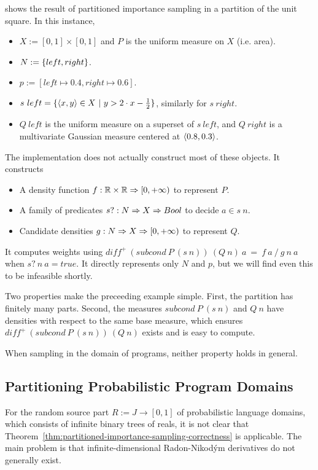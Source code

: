 \begin{example}
 shows the result of partitioned importance sampling in a partition of the unit square.
In this instance,
\begin{itemize}
	\item $X := [0,1] \times [0,1]$ and $P$ is the uniform measure on $X$ (i.e. area).
	\item $N := \{{left,right}\}$.
	\item $p := [left \mapsto 0.4, right \mapsto 0.6]$.
	\item $s~left = \lbrace {\langle{x,y}\rangle \in X} \ \lvert\ {y > 2 \cdot x - \frac{1}{2}} \rbrace$, similarly for $s~right$.
	\item $Q~left$ is the uniform measure on a superset of $s~left$, and $Q~right$ is a multivariate Gaussian measure centered at $\langle{0.8,0.3}\rangle$.
\end{itemize}
The implementation does not actually construct most of these objects. It constructs
\begin{itemize}
	\item A density function $f : \mathbb{R} \times \mathbb{R} \Rightarrow [0,+\infty)$ to represent $P$.
	\item A family of predicates $s? : N \Rightarrow X \Rightarrow Bool$ to decide $a \in s~n$.
	\item Candidate densities $g : N \Rightarrow X \Rightarrow [0,+\infty)$ to represent $Q$.
\end{itemize}
It computes weights using $diff^+~(subcond~P~(s~n))~(Q~n)~a\ =\ f~a~{/}~g~n~a$ when $s?~n~a = true$.
It directly represents only $N$ and $p$, but we will find even this to be infeasible shortly.
\exampleqed
\end{example}

Two properties make the preceeding example simple.
First, the partition has finitely many parts.
Second, the measures $subcond~P~(s~n)$ and $Q~n$ have densities with respect to the same base measure, which ensures $diff^+~(subcond~P~(s~n))~(Q~n)$ exists and is easy to compute.

When sampling in the domain of programs, neither property holds in general.

\subsection{Partitioning Probabilistic Program Domains}

For the random source part $R := J \to [0,1]$ of probabilistic language domains, which consists of infinite binary trees of reals, it is not clear that Theorem~\ref{thm:partitioned-importance-sampling-correctness} is applicable.
The main problem is that infinite-dimensional Radon-Nikod\'ym derivatives do not generally exist.

